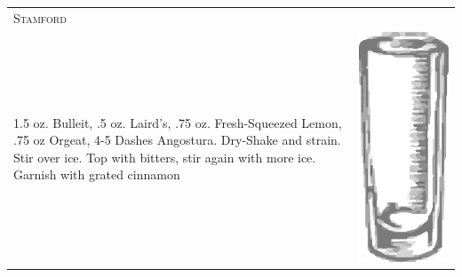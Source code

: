 \documentclass{article}
\begin{document}
\begin{tabular}{p{2in} p{0.5in}}
  \multicolumn{2}{p{3in}}{\centering\Huge\textsc{Stamford}} \\ 
  
   \vspace{-0.1in}1.5 oz. Bulleit, .5 oz. Laird's, .75 oz.  Fresh-Squeezed
    Lemon, .75 oz Orgeat, 4-5 Dashes Angostura. Dry-Shake and
    strain. Stir over ice. Top with bitters, stir again with more
    ice. Garnish with grated cinnamon &
   \vspace{-0.1in} \includegraphics{collins.png}
\end{tabular}
\end{document}
